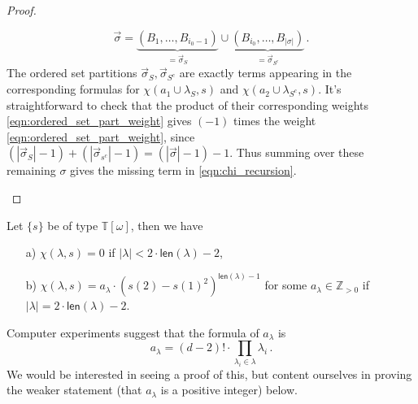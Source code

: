 \documentclass[authorcolumns,numberwithinsect]{no-lipics-v2022}
\begin{document}
\begin{proof}
\begin{itemize}
    \[
    \vec \sigma = \underbrace{(B_1, \ldots, B_{i_0-1})}_{=\vec \sigma_S} \cup \underbrace{(B_{i_0}, \ldots, B_{|\sigma|})}_{=\vec \sigma_{S^c}}\,.
    \]
    The ordered set partitions $\vec \sigma_S, \vec \sigma_{S^c}$ are exactly terms appearing in the corresponding formulas for $\chi(a_1 \cup \lambda_S, s)$ and $\chi(a_2 \cup \lambda_{S^c}, s)$. It's straightforward to check that the product of their corresponding weights \eqref{eqn:ordered_set_part_weight} gives $(-1)$ times the weight \eqref{eqn:ordered_set_part_weight}, since $(|\vec \sigma_S|-1)+(|\vec \sigma_{s^c}|-1)=(|\vec \sigma|-1)-1$. Thus summing over these remaining $\sigma$ gives the missing term in \eqref{eqn:chi_recursion}. \qedhere
\end{itemize}
\end{proof}


\begin{proposition} \label{Prop:chi_vanishing_property}
Let $\{s\}$ be of type $\mathbb{T}[\omega]$, then
we have
\begin{enumerate}
    \item[a)] $\chi(\lambda, s) = 0$ if $|\lambda| < 2\cdot  \mathsf{len}(\lambda)-2$,
    \item[b)] $\chi(\lambda, s) = a_\lambda \cdot (s(2)-s(1)^2)^{\mathsf{len}(\lambda)-1}$ for some $a_\lambda \in \mathbb{Z}_{>0}$ if $|\lambda| = 2 \cdot \mathsf{len}(\lambda)-2$.
\end{enumerate}
\end{proposition}
\begin{remark}
Computer experiments suggest that the formula of $a_\lambda$ is
\begin{equation}
a_\lambda = (d-2)! \cdot \prod_{\lambda_i \in \lambda} \lambda_i\,.
\end{equation}
We would be interested in seeing a proof of this, but content ourselves in proving the weaker statement (that $a_\lambda$ is a positive integer) below.
\end{remark}
\end{document}
